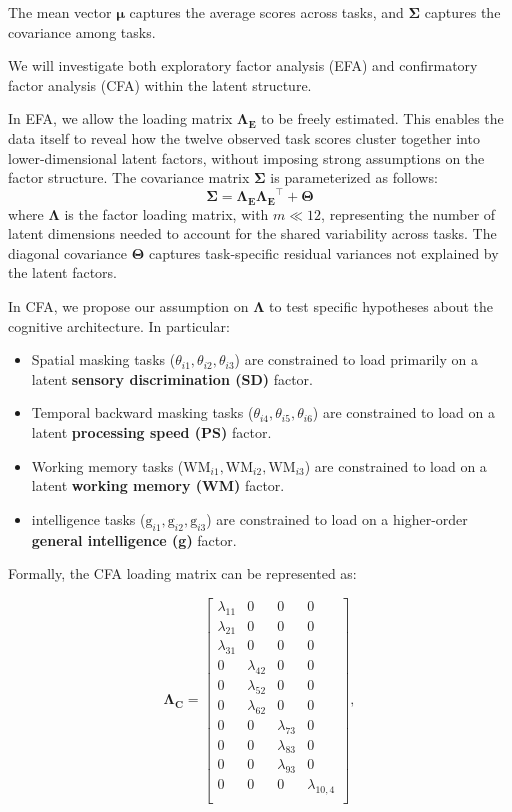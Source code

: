 \documentclass[
  ,man]{apa6}
\providecommand{\tightlist}{%
  \setlength{\itemsep}{0pt}\setlength{\parskip}{0pt}}
\begin{document}
The mean vector \(\boldsymbol{\mu}\) captures the average scores across tasks, and \(\boldsymbol{\Sigma}\) captures the covariance among tasks.

We will investigate both exploratory factor analysis (EFA) and confirmatory factor analysis (CFA) within the latent structure.

In EFA, we allow the loading matrix \(\boldsymbol{\Lambda_E}\) to be freely estimated. This enables the data itself to reveal how the twelve observed task scores cluster together into lower-dimensional latent factors, without imposing strong assumptions on the factor structure. The covariance matrix \(\boldsymbol{\Sigma}\) is parameterized as follows:
\[
\boldsymbol{\Sigma} = \boldsymbol{\Lambda_E}\boldsymbol{\Lambda_E}^\top + \boldsymbol{\Theta}
\]
where \(\boldsymbol{\Lambda}\) is the factor loading matrix, with \(m \ll 12\), representing the number of latent dimensions needed to account for the shared variability across tasks. The diagonal covariance \(\boldsymbol{\Theta}\) captures task-specific residual variances not explained by the latent factors.

In CFA, we propose our assumption on \(\boldsymbol{\Lambda}\) to test specific hypotheses about the cognitive architecture. In particular:

\begin{itemize}
\tightlist
\item
  Spatial masking tasks (\(\theta_{i1}, \theta_{i2}, \theta_{i3}\)) are constrained to load primarily on a latent \textbf{sensory discrimination (SD)} factor.\\
\item
  Temporal backward masking tasks (\(\theta_{i4}, \theta_{i5}, \theta_{i6}\)) are constrained to load on a latent \textbf{processing speed (PS)} factor.\\
\item
  Working memory tasks (\(\text{WM}_{i1}, \text{WM}_{i2}, \text{WM}_{i3}\)) are constrained to load on a latent \textbf{working memory (WM)} factor.\\
\item
  intelligence tasks (\(\text{g}_{i1}, \text{g}_{i2}, \text{g}_{i3}\)) are constrained to load on a higher-order \textbf{general intelligence (g)} factor.
\end{itemize}

Formally, the CFA loading matrix can be represented as:

\[
\boldsymbol{\Lambda_C} =
\begin{bmatrix}
\lambda_{11} & 0 & 0 & 0\\
\lambda_{21} & 0 & 0 & 0\\
\lambda_{31} & 0 & 0 & 0\\
0 & \lambda_{42} & 0 & 0\\
0 & \lambda_{52} & 0 & 0\\
0 & \lambda_{62} & 0 & 0\\
0 & 0 & \lambda_{73} & 0\\
0 & 0 & \lambda_{83} & 0\\
0 & 0 & \lambda_{93} & 0\\
0 & 0 & 0 & \lambda_{10,4} \\
\end{bmatrix},
\]
\end{document}
